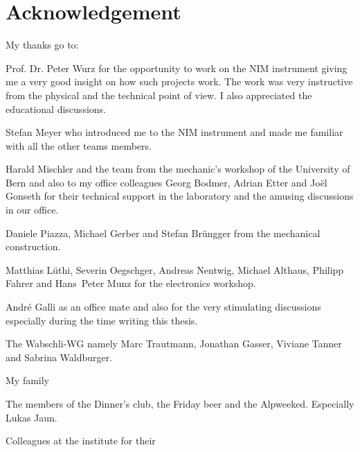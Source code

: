 \documentclass[a4paper, 12pt, abstracton]{scrartcl}
\begin{document}
	\section*{Acknowledgement}
	
	My thanks go to:
	
	Prof. Dr. Peter Wurz for the opportunity to work on the NIM instrument giving me a very good insight on how such projects work. The work was very instructive from the physical and the technical point of view. I also appreciated the educational discussions.
	
	Stefan Meyer who introduced me to the NIM instrument and made me familiar with all the other teams members.
		
	Harald Mischler and the team from the mechanic's workshop of the University of Bern and also to my office colleagues Georg Bodmer, Adrian Etter and Joël Gonseth for their technical support in the laboratory and the amusing discussions in our office.

	Daniele Piazza, Michael Gerber and Stefan Brüngger from the mechanical construction.
	
	Matthias Lüthi, Severin Oegschger, Andreas Nentwig, Michael Althaus, Philipp Fahrer and Hans~Peter Munz for the electronics workshop.
	
	André Galli as an office mate and also for the very stimulating discussions especially during the time writing this thesis.
	
	The Wabschli-WG namely Marc Trautmann, Jonathan Gasser, Viviane Tanner and Sabrina Waldburger.
	
	My family
	
	The members of the Dinner's club, the Friday beer and the Alpweeked. Especially Lukas Jaun.

	Colleagues at the institute for their
	
	\newpage
	\thispagestyle{empty}
	\null
	\newpage
	
	
	
\end{document}
